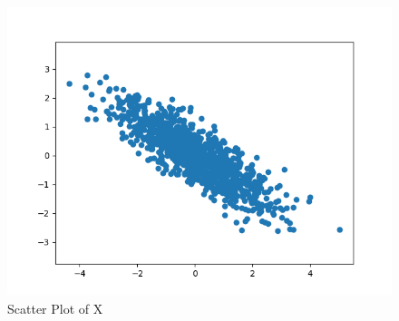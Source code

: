 \documentclass{article}
\begin{document}
\begin{figure}[H]
    \centering
    \includegraphics[width=1\textwidth]{../x-2-1.png}
    \caption{Scatter Plot of X}
\end{figure}
\end{document}

